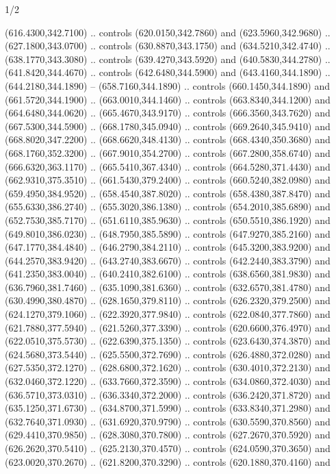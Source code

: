 \begin{flagdescription}{1/2}
\begin{scope}[xshift=0.5\flaglength,yshift=0.5\flagwidth,scale=\flagwidth/759]
\begin{scope}[y=0.8pt, x=0.8pt, yscale=-1,shift={(-720,-480)}]
\begin{scope}[cm={{1.14637,0.0,0.0,1.17117,(33.17849,82.1384)}}]
  (616.4300,342.7100) .. controls (620.0150,342.7860) and (623.5960,342.9680) ..
  (627.1800,343.0700) .. controls (630.8870,343.1750) and (634.5210,342.4740) ..
  (638.1770,343.3080) .. controls (639.4270,343.5920) and (640.5830,344.2780) ..
  (641.8420,344.4670) .. controls (642.6480,344.5900) and (643.4160,344.1890) ..
  (644.2180,344.1890) -- (658.7160,344.1890) .. controls (660.1450,344.1890) and
  (661.5720,344.1900) .. (663.0010,344.1460) .. controls (663.8340,344.1200) and
  (664.6480,344.0620) .. (665.4670,343.9170) .. controls (666.3560,343.7620) and
  (667.5300,344.5900) .. (668.1780,345.0940) .. controls (669.2640,345.9410) and
  (668.8020,347.2200) .. (668.6620,348.4130) .. controls (668.4340,350.3680) and
  (668.1760,352.3200) .. (667.9010,354.2700) .. controls (667.2800,358.6740) and
  (666.6320,363.1170) .. (665.5410,367.4340) .. controls (664.5280,371.4430) and
  (662.9310,375.3510) .. (661.5430,379.2400) .. controls (660.5240,382.0980) and
  (659.4950,384.9520) .. (658.4540,387.8020) .. controls (658.4380,387.8470) and
  (655.6330,386.2740) .. (655.3020,386.1380) .. controls (654.2010,385.6890) and
  (652.7530,385.7170) .. (651.6110,385.9630) .. controls (650.5510,386.1920) and
  (649.8010,386.0230) .. (648.7950,385.5890) .. controls (647.9270,385.2160) and
  (647.1770,384.4840) .. (646.2790,384.2110) .. controls (645.3200,383.9200) and
  (644.2570,383.9420) .. (643.2740,383.6670) .. controls (642.2440,383.3790) and
  (641.2350,383.0040) .. (640.2410,382.6100) .. controls (638.6560,381.9830) and
  (636.7960,381.7460) .. (635.1090,381.6360) .. controls (632.6570,381.4780) and
  (630.4990,380.4870) .. (628.1650,379.8110) .. controls (626.2320,379.2500) and
  (624.1270,379.1060) .. (622.3920,377.9840) .. controls (622.0840,377.7860) and
  (621.7880,377.5940) .. (621.5260,377.3390) .. controls (620.6600,376.4970) and
  (622.0510,375.5730) .. (622.6390,375.1350) .. controls (623.6430,374.3870) and
  (624.5680,373.5440) .. (625.5500,372.7690) .. controls (626.4880,372.0280) and
  (627.5350,372.1270) .. (628.6800,372.1620) .. controls (630.4010,372.2130) and
  (632.0460,372.1220) .. (633.7660,372.3590) .. controls (634.0860,372.4030) and
  (636.5710,373.0310) .. (636.3340,372.2000) .. controls (636.2420,371.8720) and
  (635.1250,371.6730) .. (634.8700,371.5990) .. controls (633.8340,371.2980) and
  (632.7640,371.0930) .. (631.6920,370.9790) .. controls (630.5590,370.8560) and
  (629.4410,370.9850) .. (628.3080,370.7800) .. controls (627.2670,370.5920) and
  (626.2620,370.5410) .. (625.2130,370.4570) .. controls (624.0590,370.3650) and
  (623.0020,370.2670) .. (621.8200,370.3290) .. controls (620.1880,370.4160) and

\end{scope}
\end{scope}
\end{scope}
\end{flagdescription}
